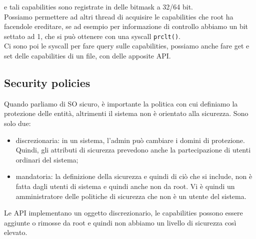 \documentclass[12pt, oneside]{extbook}
\begin{document}
e tali capabilities sono registrate in delle bitmask a 32/64 bit.\\Possiamo permettere ad altri thread di acquisire le capabilities che root ha facendole ereditare, se ad esempio per informazione di controllo abbiamo un bit settato ad 1, che si può ottenere con una syscall \texttt{prclt()}.\\Ci sono poi le syscall per fare query sulle capabilities, possiamo anche fare get e set delle capabilities di un file, con delle apposite API.
\subsection{Security policies}
Quando parliamo di SO sicuro, è importante la politica con cui definiamo la protezione delle entità, altrimenti il sistema non è orientato alla sicurezza. Sono solo due:
\begin{itemize}
	\item discrezionaria: in un sistema, l'admin può cambiare i domini di protezione.\\Quindi, gli attributi di sicurezza prevedono anche la partecipazione di utenti ordinari del sistema;
	\item mandatoria: la definizione della sicurezza e quindi di ciò che si include, non è fatta dagli utenti di sistema e quindi anche non da root. Vi è quindi un amministratore delle politiche di sicurezza che non è un utente del sistema.
\end{itemize}
Le API implementano un oggetto discrezionario, le capabilities possono essere aggiunte o rimosse da root e quindi non abbiamo un livello di sicurezza così elevato.
\end{document}
